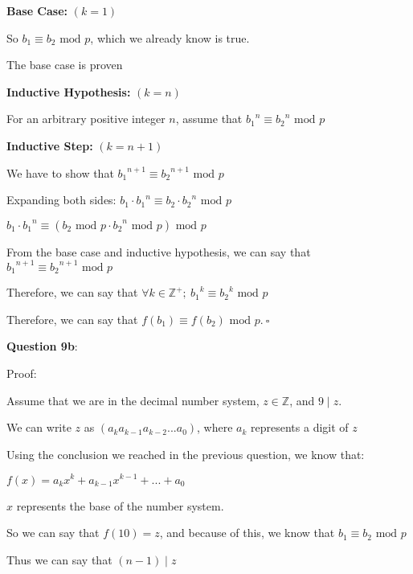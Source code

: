 \documentclass{article} %
\newcommand{\question}[2][]{\begin{flushleft}
        \textbf{Question #1}: #2

\end{flushleft}}
\begin{document}
    \tabto{1cm} \textbf{Base Case:} $(k = 1)$

    \tabto{1.5cm} So $b_1 \equiv b_2 \text{ mod } p$, which we already know is true.

    \tabto{1.5cm} The base case is proven

    \tabto{1cm} \textbf{Inductive Hypothesis:} $(k = n)$

    \tabto{1.5cm} For an arbitrary positive integer $n$, assume that ${b_1}^n \equiv {b_2}^n \text{ mod } p$

    \tabto{1cm} \textbf{Inductive Step:} $(k = n + 1)$

    \tabto{1.5cm} We have to show that ${b_1}^{n + 1} \equiv {b_2}^{n + 1} \text{ mod } p$

    \tabto{1.5cm} Expanding both sides: $b_1 \cdot {b_1}^n \equiv b_2 \cdot {b_2}^n \text{ mod } p$

    \tabto{5.07cm} $b_1 \cdot {b_1}^n \equiv (b_2 \text{ mod } p \cdot {b_2}^n \text{ mod } p) \text{ mod } p$

    \tabto{1.5cm} From the base case and inductive hypothesis, we can say that ${b_1}^{n + 1} \equiv {b_2}^{n + 1} \text{ mod } p$

    \tabto{1cm} Therefore, we can say that $\forall k \in \mathbb{Z}^+;\ {b_1}^k \equiv {b_2}^k \text{ mod } p$

    Therefore, we can say that $f({b_1}) \equiv f({b_2}) \text{ mod } p. \ \square$

    \newpage

    \question[9b]{}

    Proof:

    Assume that we are in the decimal number system, $z \in \mathbb{Z}$, and $9 \mid z$.

    We can write $z$ as $(a_k a_{k - 1} a_{k - 2} ... a_0)$, where $a_k$ represents a digit of $z$

    Using the conclusion we reached in the previous question, we know that:
    
    \tabto{4cm} $f(x) = a_kx^k + a_{k - 1}x^{k - 1} + ... + a_0$

    $x$ represents the base of the number system. 

    So we can say that $f(10) = z$, and because of this, we know that $b_1 \equiv b_2 \text{ mod } p$

    Thus we can say that $(n - 1) \mid z$
\end{document}

